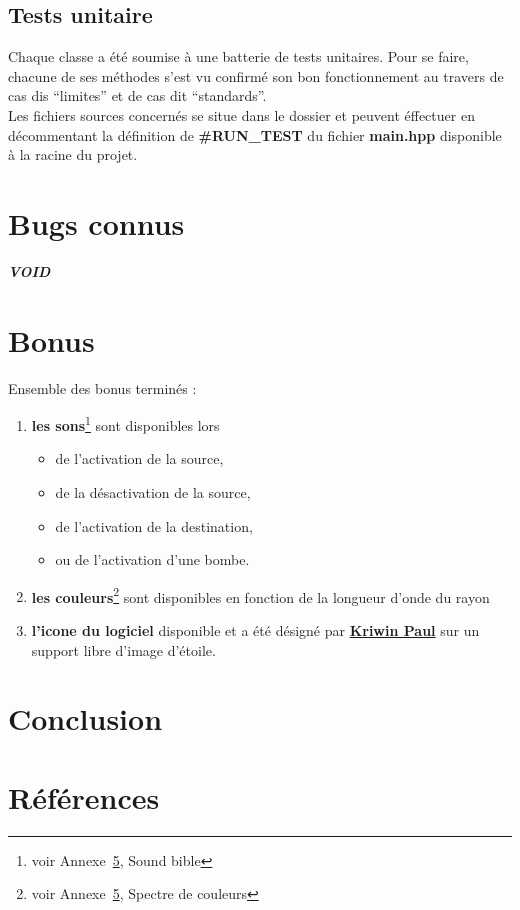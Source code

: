 \documentclass[a4paper,11pt]{report}
\begin{document}
\section{Tests unitaire}
Chaque classe a été soumise à une batterie de tests unitaires. Pour se faire,
chacune de ses méthodes s'est vu confirmé son bon fonctionnement au travers de
cas dis ``limites'' et de cas dit ``standards''. \\

Les fichiers sources concernés se situe dans le dossier  et peuvent
éffectuer en décommentant la définition de \textbf{\#RUN\_TEST} du fichier
\textbf{main.hpp} disponible à la racine du projet.
\chapter{Bugs connus}
\textbf{\textit{VOID}}
\chapter{Bonus}

Ensemble des bonus terminés :
\begin{enumerate}
	\item \textbf{les sons}\footnote{voir Annexe~\ref{ref}, Sound bible}  sont disponibles lors 
		\begin{itemize}
			\item de l'activation de la source,
			\item de la désactivation de la source,
			\item de l'activation de la destination,
			\item ou de l'activation d'une bombe.
		\end{itemize}
	\item \textbf{les couleurs}\footnote{voir Annexe~\ref{ref}, Spectre de
	couleurs}  sont disponibles en fonction de la longueur d'onde du
		rayon
	\item \textbf{l'icone du logiciel} disponible et a été désigné par
		\href{mailto:39171@heb.be}{\textbf{Kriwin Paul}} sur un support libre d'image d'étoile.
\end{enumerate}
\chapter{Conclusion}


\appendix


\chapter{Références}\label{ref}
\end{document}

